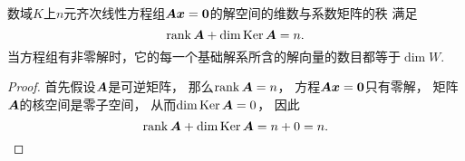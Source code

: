 \begin{theorem}\label{theorem:线性方程组.齐次线性方程组的解向量个数}
数域\(K\)上\(n\)元齐次线性方程组\(\boldsymbol{A} \boldsymbol{x} = \boldsymbol0\)的解空间的维数与系数矩阵的秩
满足\begin{equation}
	\rank\boldsymbol{A} + \dim\operatorname{Ker}\boldsymbol{A} = n.
\end{equation}
当方程组有非零解时，它的每一个基础解系所含的解向量的数目都等于\(\dim W\).
\begin{proof}
首先假设\(\boldsymbol{A}\)是可逆矩阵，
那么\(\rank\boldsymbol{A} = n\)，
方程\(\boldsymbol{A} \boldsymbol{x} = \boldsymbol0\)只有零解，
矩阵\(\boldsymbol{A}\)的核空间是零子空间，
从而\(\dim\operatorname{Ker}\boldsymbol{A} = 0\)，
因此\begin{equation*}
	\rank\boldsymbol{A} + \dim\operatorname{Ker}\boldsymbol{A}
	= n + 0
	= n.
\end{equation*}


\end{proof}
\end{theorem}
